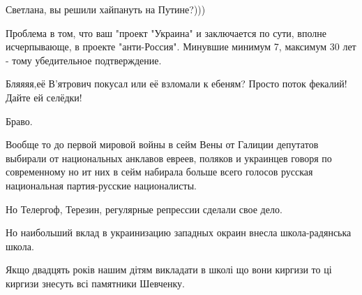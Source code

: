 \begin{itemize}
Светлана, вы решили хайпануть на Путине?)))

 

Проблема в том, что ваш "проект "Украина" и заключается по сути, вполне
исчерпывающе, в проекте "анти-Россия". Минувшие минимум 7, максимум 30 лет -
тому убедительное подтверждение.


 

Бляяяя,её В'ятрович покусал или её взломали к ебеням? Просто поток фекалий!
Дайте ей селёдки!


 

Браво.

 

Вообще то до первой мировой войны в сейм Вены от Галиции депутатов выбирали от
национальных анклавов евреев, поляков и украинцев говоря по современному но ит
них в сейм набирала больше всего голосов русская национальная партия-русские
националисты.

Но Телергоф, Терезин, регулярные репрессии сделали свое дело.

Но наибольший вклад в украинизацию западных окраин внесла школа-радянська
школа.

Якщо двадцять років нашим дітям викладати в школі що вони киргизи то ці киргизи
знесуть всі памятники Шевченку.

 


\end{itemize}
